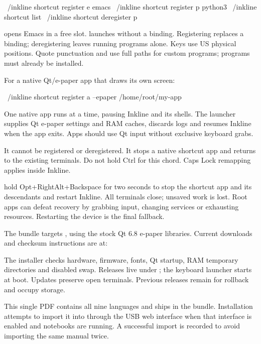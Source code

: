 \begin{shell}
~/inkline shortcut register e emacs
~/inkline shortcut register p python3
~/inkline shortcut list
~/inkline shortcut deregister p
\end{shell}

 opens Emacs in a free slot.
 launches without a binding.
Registering replaces a binding; deregistering leaves running programs alone.
Keys use US physical positions. Quote punctuation and use full paths for
custom programs; programs must already be installed.

For a native Qt/e-paper app that draws its own screen:
\begin{shell}
~/inkline shortcut register a --epaper /home/root/my-app
\end{shell}
One native app runs at a time, pausing Inkline and its shells. The launcher
supplies Qt e-paper settings and RAM caches, discards logs and resumes Inkline
when the app exits. Apps should use Qt input without exclusive keyboard grabs.

\begin{notice}
 It cannot be registered or deregistered.
It stops a native shortcut app and returns to the existing terminals.
Do not hold Ctrl for this chord. Caps Lock remapping applies inside Inkline.
\end{notice}

 hold Opt+RightAlt+Backspace for two seconds to stop the shortcut
app and its descendants and restart Inkline. All terminals close; unsaved
work is lost. Root apps can defeat recovery by grabbing input, changing
services or exhausting resources. Restarting the device is the final fallback.

The bundle targets , using the stock Qt 6.8
e-paper libraries. Current downloads and checksum instructions are at:

\InstallLink

The installer checks hardware, firmware, fonts, Qt startup, RAM temporary
directories and disabled swap. Releases live under
; the keyboard launcher starts at boot.
Updates preserve open terminals.  Previous releases remain for rollback and occupy storage.

This single PDF contains all nine languages and ships in the bundle.
Installation attempts to import it into  through the USB web
interface when that interface is enabled and notebooks are running.
A successful import is recorded to avoid importing the same manual twice.

